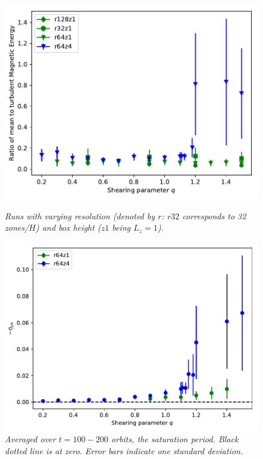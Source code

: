 \documentclass{epsconf}
\begin{document}
\begin{figure}[h]
\vspace{0cm}
\begin{minipage}{0.48\textwidth}
    \centering
    \includegraphics[width=\linewidth]{fig_vata_mtT_MEmtr_err.pdf}
    \caption{\it \small Runs with varying resolution (denoted by $r$: $r32$ corresponds to 32 zones/$H$) and box height ($z1$ being $L_z=1$).}
    \label{fig:mtbr}
\end{minipage}%
\hfill%
 \begin{minipage}{.48\textwidth}
  \centering
    \includegraphics[width=\linewidth]{fig_vataqe_etayx_const_t100-endhgbLAIF.pdf}
    \caption{\it \small Averaged over $t=100-200$ orbits, the saturation period. Black dotted line is at zero. Error bars indicate one standard deviation. }
    \label{fig:etayx}
\end{minipage}
\vspace{0cm}
\end{figure}
\end{document}
